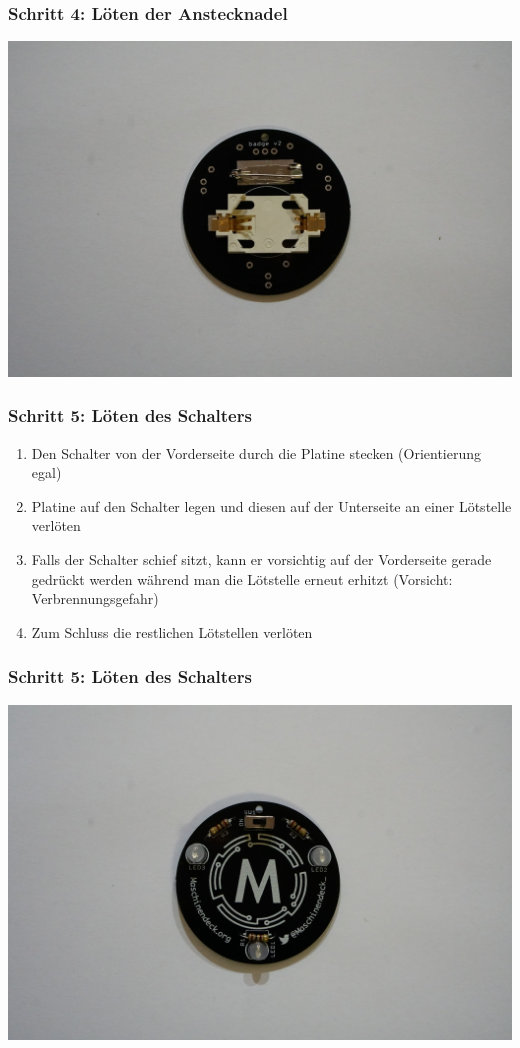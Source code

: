 \documentclass[10pt]{beamer}
\begin{document}
	\begin{frame}
		\frametitle{Schritt 4: Löten der Anstecknadel}
		\includegraphics[width=\linewidth]{images/badge18/needleAndHolder.JPG}
	\end{frame}

	\begin{frame}
	\frametitle{Schritt 5: Löten des Schalters}
	\begin{enumerate} 
		\item{Den Schalter von der Vorderseite durch die Platine stecken (Orientierung egal)}
		\item{Platine auf den Schalter legen und diesen auf der Unterseite an einer Lötstelle verlöten}
		\item{Falls der Schalter schief sitzt, kann er vorsichtig auf der Vorderseite gerade gedrückt werden während man die Lötstelle erneut erhitzt (Vorsicht: Verbrennungsgefahr)}
		\item{Zum Schluss die restlichen Lötstellen verlöten}
	\end{enumerate}
	\end{frame}

	\begin{frame}
		\frametitle{Schritt 5: Löten des Schalters}
		\includegraphics[width=\linewidth]{images/badge18/final.JPG}
	\end{frame}
\end{document}

